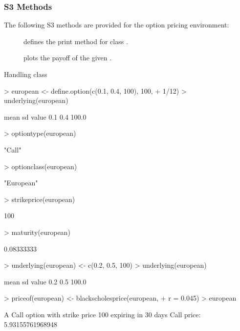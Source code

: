 \subsubsection{S3 Methods}

The following S3 methods are provided for the option pricing environment:

\begin{description}
\item[] defines the print method for class .
\item[] plots the payoff of the given .
\end{description}

\begin{Example} Handling class 
\label{ex:option}
\begin{Schunk}
\begin{Sinput}
> european <- define.option(c(0.1, 0.4, 100), 100, 
+     1/12)
> underlying(european)
\end{Sinput}
\begin{Soutput}
 mean    sd value 
  0.1   0.4 100.0 
\end{Soutput}
\begin{Sinput}
> optiontype(european)
\end{Sinput}
\begin{Soutput}
[1] "Call"
\end{Soutput}
\begin{Sinput}
> optionclass(european)
\end{Sinput}
\begin{Soutput}
[1] "European"
\end{Soutput}
\begin{Sinput}
> strikeprice(european)
\end{Sinput}
\begin{Soutput}
[1] 100
\end{Soutput}
\begin{Sinput}
> maturity(european)
\end{Sinput}
\begin{Soutput}
[1] 0.08333333
\end{Soutput}
\begin{Sinput}
> underlying(european) <- c(0.2, 0.5, 100)
> underlying(european)
\end{Sinput}
\begin{Soutput}
 mean    sd value 
  0.2   0.5 100.0 
\end{Soutput}
\begin{Sinput}
> priceof(european) <- blackscholesprice(european, 
+     r = 0.045)
> european
\end{Sinput}
\begin{Soutput}
A Call option with strike price 100
expiring in 30 days
Call price:  5.93155761968948
\end{Soutput}
\end{Schunk}
\end{Example}

